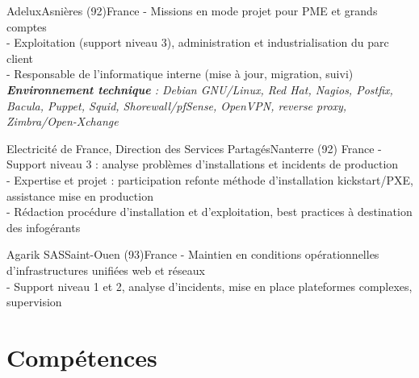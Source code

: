\documentclass[10pt,a4paper]{moderncv}
\begin{document}
{Adelux}{Asnières (92)}{France}
{
- Missions en mode projet pour PME et grands comptes\\
- Exploitation (support niveau 3), administration et industrialisation du parc
client\\
- Responsable de l'informatique interne (mise à jour, migration, suivi)\\
\textit{\textbf{Environnement technique} : Debian GNU/Linux, Red Hat, Nagios, Postfix, Bacula, Puppet, Squid, Shorewall/pfSense, OpenVPN, reverse proxy, Zimbra/Open-Xchange}
\newline{}
}

{Electricité de France, Direction des Services Partagés}{Nanterre (92)}
{France}
{
- Support niveau 3 : analyse problèmes d'installations et incidents de production\\
- Expertise et projet : participation refonte méthode d'installation kickstart/PXE,
assistance mise en production\\
- Rédaction procédure d'installation et d'exploitation, best practices à
destination des infogérants
\newline{}
}

{Agarik SAS}{Saint-Ouen (93)}{France}
{
- Maintien en conditions opérationnelles d'infrastructures unifiées web et
réseaux\\
- Support niveau 1 et 2, analyse d'incidents, mise en place plateformes
complexes, supervision
\newline{}}

\section{Compétences}
\end{document}
